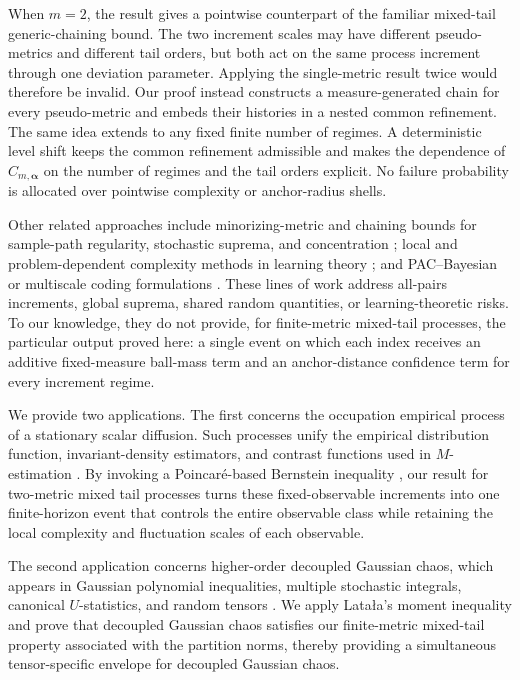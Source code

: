 \documentclass[11pt]{article}
\begin{document}
When $m=2$, the result gives a pointwise counterpart of the familiar
mixed-tail generic-chaining bound. The two increment scales may have
different pseudo-metrics and different tail orders, but both act on the
same process increment through one deviation parameter. Applying the
single-metric result twice would therefore be invalid. Our proof instead
constructs a measure-generated chain for every pseudo-metric and embeds
their histories in a nested common refinement. The same idea extends to
any fixed finite number of regimes. A deterministic level shift keeps
the common refinement admissible and makes the dependence of
$C_{m,\boldsymbol\alpha}$ on the number of regimes and the tail orders
explicit. No failure probability is allocated over pointwise complexity
or anchor-radius shells.

Other related approaches include minorizing-metric and chaining bounds
for sample-path regularity, stochastic suprema, and concentration
\citep{kwapien2004sample,bednorz2006theorem,bednorz2007holder,
bednorz2014concentration}; local and problem-dependent complexity methods
in learning theory
\citep{bartlett2005local,koltchinskii2006local,xu2025towards}; and
PAC--Bayesian or multiscale coding formulations
\citep{audibert2007combining,maurer2010codes,chu2026codes}. These lines
of work address all-pairs increments, global suprema, shared random
quantities, or learning-theoretic risks. To our knowledge, they do not
provide, for finite-metric mixed-tail processes, the particular output
proved here: a single event on which each index receives an additive
fixed-measure ball-mass term and an anchor-distance confidence term for
every increment regime.

We provide two applications. The first concerns the occupation empirical
process of a stationary scalar diffusion. Such processes unify the empirical
distribution function, invariant-density estimators, and contrast
functions used in $M$-estimation
\citep{kutoyants1997nonparametric,vanzanten2003empirical,
vandervaart2005donsker,kutoyants2010goodness}. By invoking a Poincar\'e-based
Bernstein inequality \citep{gao2014bernstein,aeckerle2021concentration}, our result for two-metric mixed tail processes
turns these fixed-observable increments into one finite-horizon event
that controls the entire observable class while retaining the local
complexity and fluctuation scales of each observable.

The second application concerns higher-order decoupled Gaussian chaos,
which appears in Gaussian polynomial inequalities, multiple stochastic
integrals, canonical $U$-statistics, and random tensors
\citep{delapena1999decoupling,major2014multiple,bamberger2022hanson}. We apply Lata{\l}a's moment inequality \citep{latala2006estimates} and prove that decoupled Gaussian chaos satisfies our finite-metric mixed-tail property associated with the partition norms, thereby providing a simultaneous tensor-specific envelope for decoupled Gaussian chaos.
\end{document}
